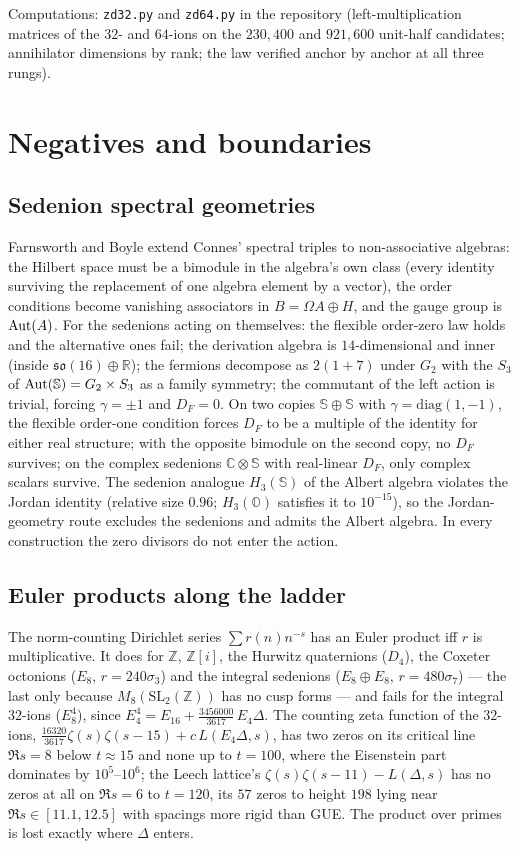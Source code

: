 \documentclass[11pt]{amsart}
\theoremstyle{definition}
\renewcommand{\O}{\mathbb{O}}\newcommand{\Sd}{\mathbb{S}}\newcommand{\Hq}{\mathbb{H}}\newcommand{\Z}{\mathbb{Z}}\newcommand{\Q}{\mathbb{Q}}\newcommand{\R}{\mathbb{R}}\newcommand{\C}{\mathbb{C}}\newcommand{\F}{\mathbb{F}}
\begin{document}
Computations: \texttt{zd32.py} and \texttt{zd64.py} in the repository (left-multiplication matrices of the $32$- and $64$-ions on the $230{,}400$ and $921{,}600$ unit-half candidates; annihilator dimensions by rank; the law verified anchor by anchor at all three rungs).

\section{Negatives and boundaries}\label{sec:negatives}
\subsection{Sedenion spectral geometries}
Farnsworth and Boyle \cite{FB13,BF14} extend Connes' spectral triples to non-associative algebras: the Hilbert space must be a bimodule in the algebra's own class (every identity surviving the replacement of one algebra element by a vector), the order conditions become vanishing associators in $B=\Omega A\oplus H$, and the gauge group is $\operatorname{Aut}(A)$. For the sedenions acting on themselves: the flexible order-zero law holds and the alternative ones fail; the derivation algebra is $14$-dimensional and inner (inside $\mathfrak{so}(16)\oplus\R$); the fermions decompose as $2(1+7)$ under $G_2$ with the $S_3$ of $\Aut(\Sd)=G_2\times S_3$ as a family symmetry; the commutant of the left action is trivial, forcing $\gamma=\pm 1$ and $D_F=0$. On two copies $\Sd\oplus\Sd$ with $\gamma=\mathrm{diag}(1,-1)$, the flexible order-one condition forces $D_F$ to be a multiple of the identity for either real structure; with the opposite bimodule on the second copy, no $D_F$ survives; on the complex sedenions $\C\otimes\Sd$ with real-linear $D_F$, only complex scalars survive. The sedenion analogue $H_3(\Sd)$ of the Albert algebra violates the Jordan identity (relative size $0.96$; $H_3(\O)$ satisfies it to $10^{-15}$), so the Jordan-geometry route \cite{BF14} excludes the sedenions and admits the Albert algebra. In every construction the zero divisors do not enter the action.
\subsection{Euler products along the ladder}
The norm-counting Dirichlet series $\sum r(n)n^{-s}$ has an Euler product iff $r$ is multiplicative. It does for $\Z$, $\Z[i]$, the Hurwitz quaternions ($D_4$), the Coxeter octonions ($E_8$, $r=240\sigma_3$) and the integral sedenions ($E_8\oplus E_8$, $r=480\sigma_7$) --- the last only because $M_8(\mathrm{SL}_2(\Z))$ has no cusp forms --- and fails for the integral $32$-ions ($E_8^4$), since $E_4^4=E_{16}+\tfrac{3456000}{3617}\,E_4\Delta$. The counting zeta function of the $32$-ions, $\tfrac{16320}{3617}\zeta(s)\zeta(s-15)+c\,L(E_4\Delta,s)$, has two zeros on its critical line $\Re s=8$ below $t\approx 15$ and none up to $t=100$, where the Eisenstein part dominates by $10^5$--$10^6$; the Leech lattice's $\zeta(s)\zeta(s-11)-L(\Delta,s)$ has no zeros at all on $\Re s=6$ to $t=120$, its $57$ zeros to height $198$ lying near $\Re s\in[11.1,12.5]$ with spacings more rigid than GUE. The product over primes is lost exactly where $\Delta$ enters.
\end{document}
